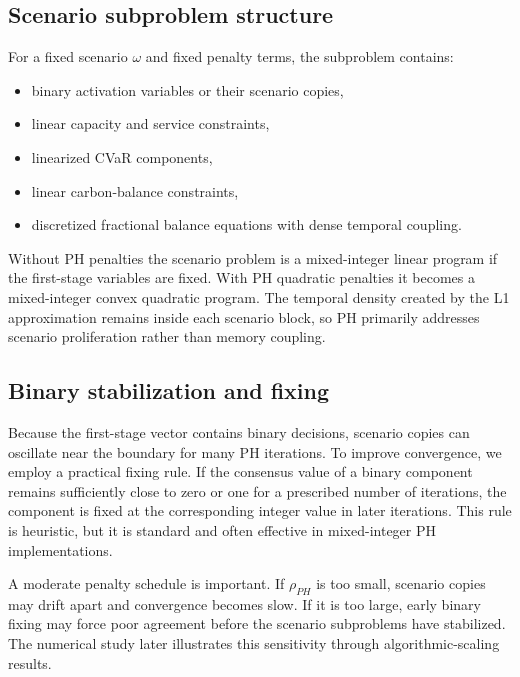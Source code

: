 \subsection{Scenario subproblem structure}
For a fixed scenario $\omega$ and fixed penalty terms, the subproblem contains:
\begin{itemize}[leftmargin=1.8em]
    \item binary activation variables or their scenario copies,
    \item linear capacity and service constraints,
    \item linearized CVaR components,
    \item linear carbon-balance constraints,
    \item discretized fractional balance equations with dense temporal coupling.
\end{itemize}
Without PH penalties the scenario problem is a mixed-integer linear program if the first-stage variables are fixed. With PH quadratic penalties it becomes a mixed-integer convex quadratic program. The temporal density created by the L1 approximation remains inside each scenario block, so PH primarily addresses scenario proliferation rather than memory coupling.

\subsection{Binary stabilization and fixing}
Because the first-stage vector contains binary decisions, scenario copies can oscillate near the boundary for many PH iterations. To improve convergence, we employ a practical fixing rule. If the consensus value of a binary component remains sufficiently close to zero or one for a prescribed number of iterations, the component is fixed at the corresponding integer value in later iterations. This rule is heuristic, but it is standard and often effective in mixed-integer PH implementations.

A moderate penalty schedule is important. If $\rho_{PH}$ is too small, scenario copies may drift apart and convergence becomes slow. If it is too large, early binary fixing may force poor agreement before the scenario subproblems have stabilized. The numerical study later illustrates this sensitivity through algorithmic-scaling results.

